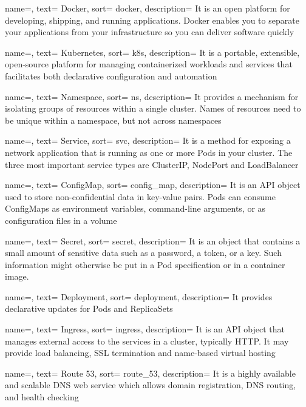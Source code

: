 {
  name=,
  text= Docker,
  sort= docker,
  description= {It is an open platform for developing, shipping, and running applications. Docker enables you to separate your applications from your infrastructure so you can deliver software quickly}
}

{
  name=,
  text= Kubernetes,
  sort= k8s,
  description= {It is a portable, extensible, open-source platform for managing containerized workloads and services that facilitates both declarative configuration and automation}
}

{
  name=,
  text= Namespace,
  sort= ns,
  description= {It provides a mechanism for isolating groups of resources within a single cluster. Names of resources need to be unique within a namespace, but not across namespaces}
}

{
  name=,
  text= Service,
  sort= svc,
  description= {It is a method for exposing a network application that is running as one or more Pods in your cluster. The three most important service types are ClusterIP, NodePort and LoadBalancer}
}

{
  name=,
  text= ConfigMap,
  sort= config_map,
  description= {It is an API object used to store non-confidential data in key-value pairs. Pods can consume ConfigMaps as environment variables, command-line arguments, or as configuration files in a volume}
}

{
  name=,
  text= Secret,
  sort= secret,
  description= {It is an object that contains a small amount of sensitive data such as a password, a token, or a key. Such information might otherwise be put in a Pod specification or in a container image.}
}

{
  name=,
  text= Deployment,
  sort= deployment,
  description= {It provides declarative updates for Pods and ReplicaSets}
}

{
  name=,
  text= Ingress,
  sort= ingress,
  description= {It is an API object that manages external access to the services in a cluster, typically HTTP. It may provide load balancing, SSL termination and name-based virtual hosting}
}

{
  name=,
  text= Route 53,
  sort= route_53,
  description= {It is a highly available and scalable DNS web service which allows domain registration, DNS routing, and health checking}
}

